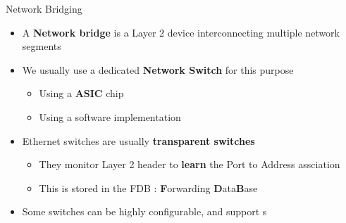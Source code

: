 \begin{frame}{Network Bridging}
	\begin{itemize}
		\item A \textbf{Network bridge} is a Layer 2 device interconnecting multiple network segments
		\item We usually use a dedicated \textbf{Network Switch} for this purpose
			\begin{itemize}
				\item Using a \textbf{ASIC} chip
				\item Using a software implementation
			\end{itemize}
		\item Ethernet switches are usually \textbf{transparent switches}
			\begin{itemize}
				\item They monitor Layer 2 header to \textbf{learn} the Port to Address assciation
				\item This is stored in the FDB : \textbf{F}orwarding \textbf{D}ata\textbf{B}ase
			\end{itemize}
		\item Some switches can be highly configurable, and support s
	\end{itemize}
\end{frame}

